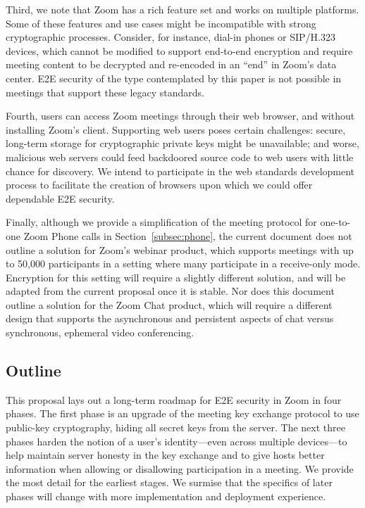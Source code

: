Third, we note that Zoom has a rich feature set and works on multiple platforms. Some of these features and use cases might be incompatible with strong cryptographic processes. Consider, for instance, dial-in phones or SIP/H.323 devices, which cannot be modified to support end-to-end encryption and require meeting content to be decrypted and re-encoded in an ``end'' in Zoom's data center. E2E security of the type contemplated by this paper is not possible in meetings that support these legacy standards.

Fourth, users can access Zoom meetings through their web browser, and without installing Zoom's client. Supporting web users poses certain challenges: secure, long-term storage for cryptographic private keys might be unavailable; and worse, malicious web servers could feed backdoored source code to web users with little chance for discovery. We intend to participate in the web standards development process to facilitate the creation of browsers upon which we could offer dependable E2E security.

Finally, although we provide a simplification of the meeting protocol for one-to-one Zoom Phone calls in Section~\ref{subsec:phone}, the current document does not outline a solution for Zoom's webinar product, which supports meetings with up to 50,000 participants in a setting where many participate in a receive-only mode. Encryption for this setting will require a slightly different solution, and will be adapted from the current proposal once it is stable. Nor does this document outline a solution for the Zoom Chat product, which will require a different design that supports the asynchronous and persistent aspects of chat versus synchronous, ephemeral video conferencing.

\subsection{Outline}
This proposal lays out a long-term roadmap for E2E security in Zoom in four phases. The first phase is an upgrade of the meeting key exchange protocol to use public-key cryptography, hiding all secret keys from the server. The next three phases harden the notion of a user's identity---even across multiple devices---to help maintain server honesty in the key exchange and to give hosts better information when allowing or disallowing participation in a meeting. We provide the most detail for the earliest stages. We surmise that the specifics of later phases will change with more implementation and deployment experience.
